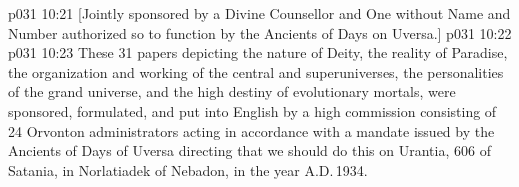 \vsetoff
\vs p031 10:21 [Jointly sponsored by a Divine Counsellor and One without Name and Number authorized so to function by the Ancients of Days on Uversa.]
\vs p031 10:22 \separatorline
\vs p031 10:23 These 31 papers depicting the nature of Deity, the reality of Paradise, the organization and working of the central and superuniverses, the personalities of the grand universe, and the high destiny of evolutionary mortals, were sponsored, formulated, and put into English by a high commission consisting of 24 Orvonton administrators acting in accordance with a mandate issued by the Ancients of Days of Uversa directing that we should do this on Urantia, 606 of Satania, in Norlatiadek of Nebadon, in the year A.D.\,1934.
\quizlink
